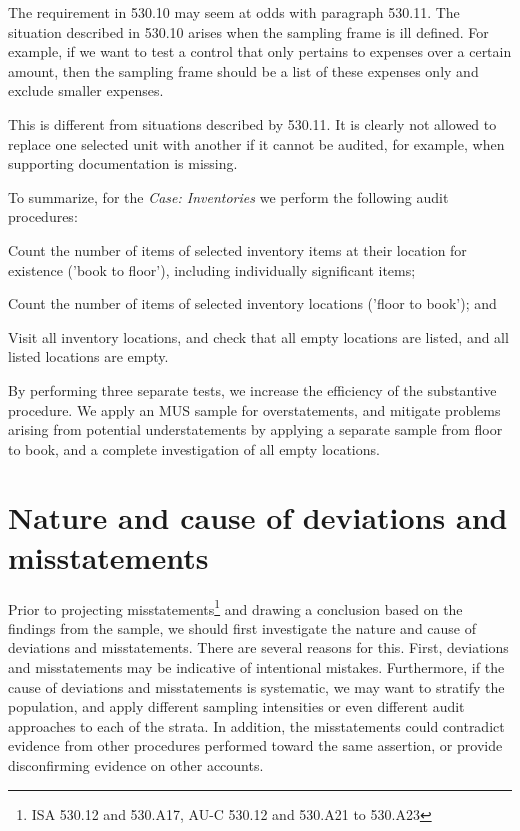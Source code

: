 The requirement in 530.10 may seem at odds with paragraph 530.11. The situation described in 530.10 arises when the sampling frame is ill defined. For example, if we want to test a control that only pertains to expenses over a certain amount, then the sampling frame should be a list of these expenses only and exclude smaller expenses. 

This is different from situations described by 530.11. It is clearly not allowed to replace one selected unit with another if it cannot be audited, for example, when supporting documentation is missing.

\bigskip
To summarize, for the \emph{Case: Inventories} we perform the following audit procedures:

\begin{compactitem}
	\item Count the number of items of selected inventory items at their location for existence ('book to floor'), including individually significant items;
	\item Count the number of items of selected inventory locations ('floor to book'); and
	\item Visit all inventory locations, and check that all empty locations are listed, and all listed locations are empty.
\end{compactitem}

By performing three separate tests, we increase the efficiency of the substantive procedure. We apply an MUS sample for overstatements, and mitigate problems arising from potential understatements by applying a separate sample from floor to book, and a complete investigation of all empty locations.


\section{Nature and cause of deviations and misstatements} %
\label{sec:nature_and_cause_of_deviations_and_misstatements}

Prior to projecting misstatements\footnote{ISA 530.12 and 530.A17, AU-C 530.12 and 530.A21 to 530.A23} and drawing a conclusion based on the findings from the sample, we should first investigate the nature and cause of deviations and misstatements. There are several reasons for this. First, deviations and misstatements may be indicative of intentional mistakes. Furthermore, if the cause of deviations and misstatements is systematic, we may want to stratify the population, and apply different sampling intensities or even different audit approaches to each of the strata. In addition, the misstatements could contradict evidence from other procedures performed toward the same assertion, or provide disconfirming evidence on other accounts.

